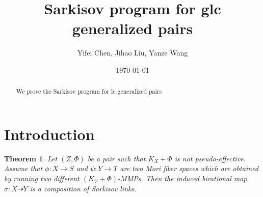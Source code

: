 \documentclass[11pt]{amsart}
\numberwithin{equation}{section}
\newtheorem{thm}{Theorem}[section]
\theoremstyle{definition}
\theoremstyle{definition}
\theoremstyle{definition}
\begin{document}
\title{Sarkisov program for glc generalized pairs}
\author{Yifei Chen, Jihao Liu, Yanze Wang}







\date{\today}

\begin{abstract}
We prove the Sarkisov program for lc generalized pairs
\end{abstract}


\maketitle
\tableofcontents

\section{Introduction}

\begin{thm}\label{sp} 
Let $(Z,\Phi)$ be a  pair such that $K_X+\Phi$ is not pseudo-effective. Assume that $\phi: X\rightarrow S$ and $\psi: Y\rightarrow T$ are two Mori fiber spaces which are obtained by running two different $(K_Z+\Phi)$-MMPs. Then the induced birational map $\sigma: X\dashrightarrow Y$ is a composition of Sarkisov links.
\end{thm}
\end{document}

